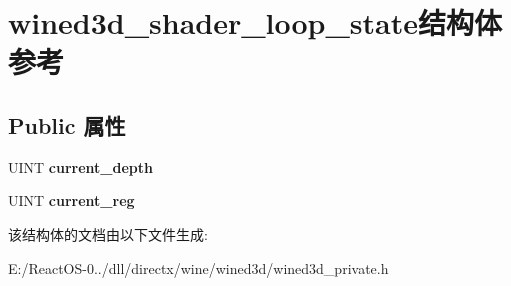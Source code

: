 \hypertarget{structwined3d__shader__loop__state}{}\section{wined3d\+\_\+shader\+\_\+loop\+\_\+state结构体 参考}
\label{structwined3d__shader__loop__state}
\subsection*{Public 属性}
\begin{DoxyCompactItemize}
\item 
\mbox{\label{structwined3d__shader__loop__state_a9030597390fd2b75e254aac6db2ffef1}} 
U\+I\+NT {\bfseries current\+\_\+depth}
\item 
\mbox{\label{structwined3d__shader__loop__state_aeec36978956dc19293e8447297b51c01}} 
U\+I\+NT {\bfseries current\+\_\+reg}
\end{DoxyCompactItemize}


该结构体的文档由以下文件生成\+:\begin{DoxyCompactItemize}
\item 
E\+:/\+React\+O\+S-\/0../dll/directx/wine/wined3d/wined3d\+\_\+private.\+h\end{DoxyCompactItemize}
